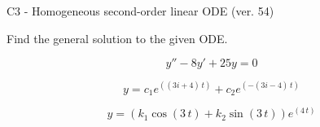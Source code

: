 \begin{exercise}
  \begin{exerciseTitle}C3 - Homogeneous second-order linear ODE (ver. 54)\end{exerciseTitle}
  \begin{exerciseStatement}
    
Find the general solution to the given ODE.

    
\[y''-8y'+25y = 0\]

  \end{exerciseStatement}
  \begin{exerciseAnswer}
    
\[y= c_{1} e^{\left(\left(3 i + 4\right) \, t\right)} + c_{2} e^{\left(-\left(3 i - 4\right) \, t\right)}\]

    
\[y= {\left(k_{1} \cos\left(3 \, t\right) + k_{2} \sin\left(3 \, t\right)\right)} e^{\left(4 \, t\right)}\]

  \end{exerciseAnswer}
\end{exercise}